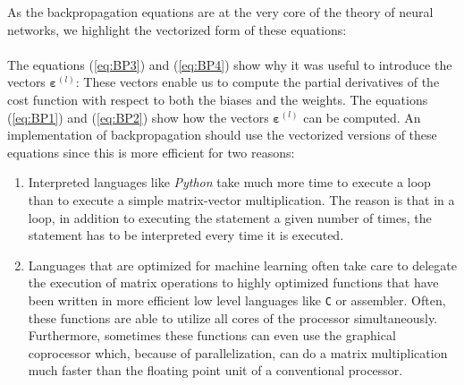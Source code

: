 As the backpropagation equations  are at the very core of the theory of neural
networks, we highlight the vectorized form of these equations:
\\[0.2cm]
\hspace*{0.3cm}
\colorbox{red}{}
\\[0.2cm]
The equations (\ref{eq:BP3}) and (\ref{eq:BP4}) show why it was useful to introduce the
vectors $\boldsymbol{\varepsilon}^{(l)}$: These vectors enable us to compute the partial derivatives of the cost function
with respect to both the biases and the weights.  The equations (\ref{eq:BP1}) and (\ref{eq:BP2})
show how the vectors $\boldsymbol{\varepsilon}^{(l)}$ can be computed.  An implementation of backpropagation should use the vectorized
versions of these equations since this is more efficient for two reasons:
\begin{enumerate}
\item Interpreted languages like \textsl{Python} take much more time to
      execute a loop than to execute a simple matrix-vector multiplication.  The reason is that in a loop, in
      addition to executing the statement a given number of times, the statement has to be interpreted 
      every time it is executed.
\item Languages that are optimized for machine learning often take care to delegate the execution of matrix
      operations to highly optimized functions that have been written in more efficient low level languages like
      \texttt{C} or assembler.  Often, these functions are able to utilize all cores of the processor
      simultaneously.  Furthermore, sometimes these functions can even use the graphical coprocessor
      which, because of parallelization, can do a matrix multiplication much faster than the floating point unit of
      a conventional processor.
\end{enumerate}

